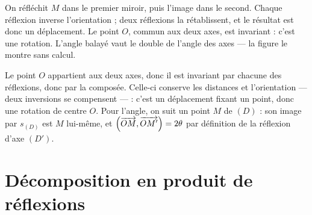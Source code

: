 \begin{visualisation}
\begin{center}
\end{center}

On réfléchit $M$ dans le premier miroir, puis l'image dans le second. Chaque
réflexion inverse l'orientation ; deux réflexions la rétablissent, et le
résultat est donc un déplacement. Le point $O$, commun aux deux axes, est
invariant : c'est une rotation. L'angle balayé vaut le double de l'angle des
axes — la figure le montre sans calcul.
\end{visualisation}

\begin{demonstration}
Le point $O$ appartient aux deux axes, donc il est invariant par chacune des
réflexions, donc par la composée. Celle-ci conserve les distances et
l'orientation — deux inversions se compensent — : c'est un déplacement fixant
un point, donc une rotation de centre $O$. Pour l'angle, on suit un point $M$
de $(D)$ : son image par $s_{(D)}$ est $M$ lui-même, et
$\left(\overrightarrow{OM},\overrightarrow{OM'}\right) = 2\theta$ par définition de la réflexion
d'axe $(D')$.
\end{demonstration}

\section{Décomposition en produit de réflexions}

